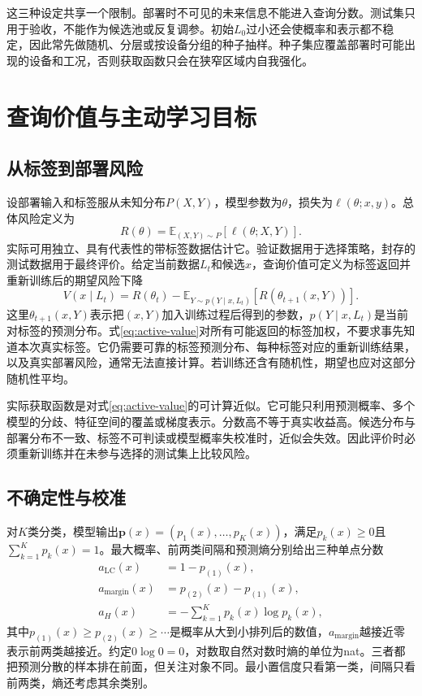 这三种设定共享一个限制。部署时不可见的未来信息不能进入查询分数。测试集只用于验收，不能作为候选池或反复调参。初始$L_0$过小还会使概率和表示都不稳定，因此常先做随机、分层或按设备分组的种子抽样。种子集应覆盖部署时可能出现的设备和工况，否则获取函数只会在狭窄区域内自我强化。

\section{查询价值与主动学习目标}

\subsection{从标签到部署风险}

设部署输入和标签服从未知分布$P(X,Y)$，模型参数为$\theta$，损失为$\ell(\theta;x,y)$。总体风险定义为
\begin{equation}
 R(\theta)=\mathbb E_{(X,Y)\sim P}[\ell(\theta;X,Y)].
 \label{eq:active-risk}
\end{equation}
实际可用独立、具有代表性的带标签数据估计它。验证数据用于选择策略，封存的测试数据用于最终评价。给定当前数据$L_t$和候选$x$，查询价值可定义为标签返回并重新训练后的期望风险下降
\begin{equation}
 V(x\mid L_t)=R(\theta_t)-\mathbb E_{Y\sim p(Y\mid x,L_t)}[R(\theta_{t+1}(x,Y))].
 \label{eq:active-value}
\end{equation}
这里$\theta_{t+1}(x,Y)$表示把$(x,Y)$加入训练过程后得到的参数，$p(Y\mid x,L_t)$是当前对标签的预测分布。式\eqref{eq:active-value}对所有可能返回的标签加权，不要求事先知道本次真实标签。它仍需要可靠的标签预测分布、每种标签对应的重新训练结果，以及真实部署风险，通常无法直接计算。若训练还含有随机性，期望也应对这部分随机性平均。

实际获取函数是对式\eqref{eq:active-value}的可计算近似。它可能只利用预测概率、多个模型的分歧、特征空间的覆盖或梯度表示。分数高不等于真实收益高。候选分布与部署分布不一致、标签不可判读或模型概率失校准时，近似会失效。因此评价时必须重新训练并在未参与选择的测试集上比较风险。

\subsection{不确定性与校准}

对$K$类分类，模型输出$\bm p(x)=(p_1(x),\ldots,p_K(x))$，满足$p_k(x)\geq0$且$\sum_{k=1}^Kp_k(x)=1$。最大概率、前两类间隔和预测熵分别给出三种单点分数
\begin{align}
 a_{\mathrm{LC}}(x)&=1-p_{(1)}(x),\\
 a_{\mathrm{margin}}(x)&=p_{(2)}(x)-p_{(1)}(x),\\
 a_{H}(x)&=-\sum_{k=1}^{K}p_k(x)\log p_k(x),
 \label{eq:active-uncertainty}
\end{align}
其中$p_{(1)}(x)\geq p_{(2)}(x)\geq\cdots$是概率从大到小排列后的数值，$a_{\mathrm{margin}}$越接近零表示前两类越接近。约定$0\log0=0$，对数取自然对数时熵的单位为nat。三者都把预测分散的样本排在前面，但关注对象不同。最小置信度只看第一类，间隔只看前两类，熵还考虑其余类别。


